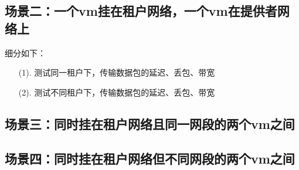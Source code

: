 \documentclass[a4paper,left=1.5cm,right=1.5cm,11pt]{article}
\begin{document}
\subsection{场景二：一个vm挂在租户网络，一个vm在提供者网络上}
细分如下：
\begin{itemize}
	\item[(1).]测试同一租户下，传输数据包的延迟、丢包、带宽
	\item[(2).]测试不同租户下，传输数据包的延迟、丢包、带宽
\end{itemize}
\subsection{场景三：同时挂在租户网络且同一网段的两个vm之间}
\subsection{场景四：同时挂在租户网络但不同网段的两个vm之间}
\end{document}
